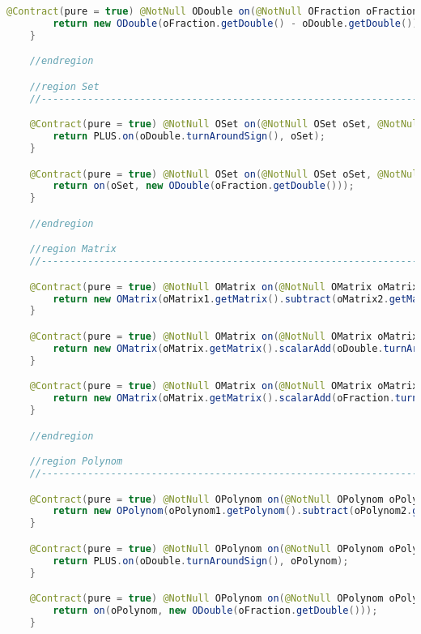 \begin{lstlisting}[caption=Minus (Schwenke),label=list:Minus,language=Java]
    @Contract(pure = true) @NotNull ODouble on(@NotNull OFraction oFraction, @NotNull ODouble oDouble) {
        return new ODouble(oFraction.getDouble() - oDouble.getDouble());
    }

    //endregion

    //region Set
    //------------------------------------------------------------------------------------

    @Contract(pure = true) @NotNull OSet on(@NotNull OSet oSet, @NotNull ODouble oDouble) {
        return PLUS.on(oDouble.turnAroundSign(), oSet);
    }

    @Contract(pure = true) @NotNull OSet on(@NotNull OSet oSet, @NotNull OFraction oFraction) {
        return on(oSet, new ODouble(oFraction.getDouble()));
    }

    //endregion

    //region Matrix
    //------------------------------------------------------------------------------------

    @Contract(pure = true) @NotNull OMatrix on(@NotNull OMatrix oMatrix1, @NotNull OMatrix oMatrix2) {
        return new OMatrix(oMatrix1.getMatrix().subtract(oMatrix2.getMatrix()));
    }

    @Contract(pure = true) @NotNull OMatrix on(@NotNull OMatrix oMatrix, @NotNull ODouble oDouble) {
        return new OMatrix(oMatrix.getMatrix().scalarAdd(oDouble.turnAroundSign().getDouble()));
    }

    @Contract(pure = true) @NotNull OMatrix on(@NotNull OMatrix oMatrix, @NotNull OFraction oFraction) {
        return new OMatrix(oMatrix.getMatrix().scalarAdd(oFraction.turnAroundSign().getDouble()));
    }

    //endregion

    //region Polynom
    //------------------------------------------------------------------------------------

    @Contract(pure = true) @NotNull OPolynom on(@NotNull OPolynom oPolynom1, @NotNull OPolynom oPolynom2) {
        return new OPolynom(oPolynom1.getPolynom().subtract(oPolynom2.getPolynom()));
    }

    @Contract(pure = true) @NotNull OPolynom on(@NotNull OPolynom oPolynom, @NotNull ODouble oDouble) {
        return PLUS.on(oDouble.turnAroundSign(), oPolynom);
    }

    @Contract(pure = true) @NotNull OPolynom on(@NotNull OPolynom oPolynom, @NotNull OFraction oFraction) {
        return on(oPolynom, new ODouble(oFraction.getDouble()));
    }


\end{lstlisting}

